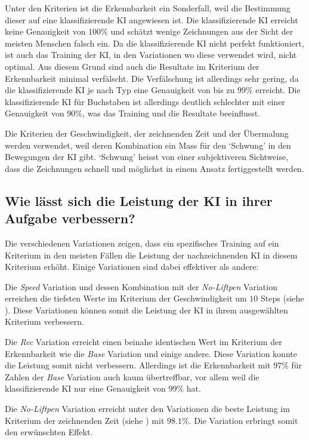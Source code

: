 Unter den Kriterien ist die Erkennbarkeit ein Sonderfall, weil die Bestimmung
dieser auf eine klassifizierende KI angewiesen ist. Die klassifizierende KI
erreicht keine Genauigkeit von $100\%$ und schätzt wenige Zeichnungen aus der
Sicht der meisten Menschen falsch ein. Da die klassifizierende KI nicht perfekt
funktioniert, ist auch das Training der KI, in den Variationen wo diese
verwendet wird, nicht optimal. Aus diesem Grund sind auch die Resultate im
Kriterium der Erkennbarkeit minimal verfälscht. Die Verfälschung ist allerdings
sehr gering, da die klassifizierende KI je nach Typ eine Genauigkeit von bis zu
$99\%$ erreicht. Die klassifizierende KI für Buchstaben ist allerdings deutlich
schlechter mit einer Genauigkeit von $90\%$, was das Training und die Resultate
beeinflusst.

Die Kriterien der Geschwindigkeit, der zeichnenden Zeit und der Übermalung
werden verwendet, weil deren Kombination ein Mass für den `Schwung' in den
Bewegungen der KI gibt. `Schwung' heisst von einer subjektiveren Sichtweise, dass
die Zeichnungen schnell und möglichst in einem Ansatz fertiggestellt werden.



\subsection{Wie lässt sich die Leistung der KI in ihrer Aufgabe verbessern?}\label{subsub:d_frage_unter_3}
Die verschiedenen Variationen zeigen, dass ein spezifisches Training auf ein
Kriterium in den meisten Fällen die Leistung der nachzeichnenden KI in diesem
Kriterium erhöht. Einige Variationen sind dabei effektiver als andere:


Die \emph{Speed} Variation und dessen Kombination mit der \emph{No-Liftpen}
Variation erreichen die tiefsten Werte im Kriterium der Geschwindigkeit um $10$
Steps (siehe ). Diese Variationen können somit
die Leistung der KI in ihrem ausgewählten Kriterium verbessern.

Die \emph{Rec} Variation erreicht einen beinahe identischen Wert im Kriterium
der Erkennbarkeit wie die \emph{Base} Variation und einige andere. Diese
Variation konnte die Leistung somit nicht verbessern. Allerdings ist die
Erkennbarkeit mit $97\%$ für Zahlen der \emph{Base} Variation auch kaum
übertreffbar, vor allem weil die klassifizierende KI nur eine Genauigkeit von
$99\%$ hat.

Die \emph{No-Liftpen} Variation erreicht unter den Variationen die beste
Leistung im Kriterium der zeichnenden Zeit (siehe
) mit $98.1\%$. Die Variation erbringt somit den
erwünschten Effekt.

